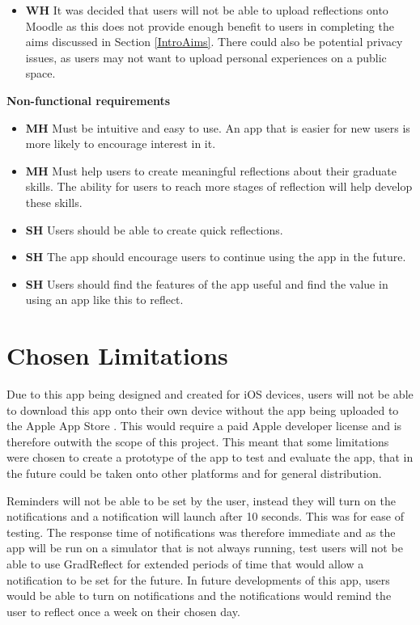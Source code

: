 \documentclass{l4proj}
\begin{document}
\begin{itemize}
    \item \textbf{WH} It was decided that users will not be able to upload reflections onto Moodle as this does not provide enough benefit to users in completing the aims discussed in Section \ref{IntroAims}. There could also be potential privacy issues, as users may not want to upload personal experiences on a public space.
\end{itemize}


\textbf{Non-functional requirements}
\begin{itemize}
    \item \textbf{MH} Must be intuitive and easy to use. An app that is easier for new users is more likely to encourage interest in it.
    \item \textbf{MH} Must help users to create meaningful reflections about their graduate skills. The ability for users to reach more stages of reflection will help develop these skills.
    \item \textbf{SH} Users should be able to create quick reflections.
    \item \textbf{SH} The app should encourage users to continue using the app in the future.
    \item \textbf{SH} Users should find the features of the app useful and find the value in using an app like this to reflect. 
\end{itemize}


\section{Chosen Limitations}

Due to this app being designed and created for iOS devices, users will not be able to download this app onto their own device without the app being uploaded to the Apple App Store \citep{apple_inc_app_2021}. This would require a paid Apple developer license and is therefore outwith the scope of this project. This meant that some limitations were chosen to create a prototype of the app to test and evaluate the app, that in the future could be taken onto other platforms and for general distribution.

Reminders will not be able to be set by the user, instead they will turn on the notifications and a notification will launch after 10 seconds. This was for ease of testing. The response time of notifications was therefore immediate and as the app will be run on a simulator that is not always running, test users will not be able to use GradReflect for extended periods of time that would allow a notification to be set for the future. In future developments of this app, users would be able to turn on notifications and the notifications would remind the user to reflect once a week on their chosen day.
\end{document}
